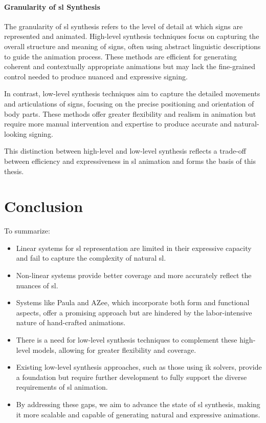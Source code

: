 \documentclass[../../main.tex]{subfiles}
\begin{document}
\paragraph{Granularity of \gls{sl} Synthesis}
\label{ch:background_work:sign_language_synthesis:3d_techniques:sign_language_synthesis_systems:granularity_of_sl_synthesis}

The granularity of \gls{sl} synthesis refers to the level of detail at which signs are represented and animated. High-level synthesis techniques focus on capturing the overall structure and meaning of signs, often using abstract linguistic descriptions to guide the animation process. These methods are efficient for generating coherent and contextually appropriate animations but may lack the fine-grained control needed to produce nuanced and expressive signing.

In contrast, low-level synthesis techniques aim to capture the detailed movements and articulations of signs, focusing on the precise positioning and orientation of body parts. These methods offer greater flexibility and realism in animation but require more manual intervention and expertise to produce accurate and natural-looking signing.

This distinction between high-level and low-level synthesis reflects a trade-off between efficiency and expressiveness in \gls{sl} animation and forms the basis of this thesis.

\section{Conclusion}
\label{ch:background_work:conclusion}

To summarize:

\begin{itemize} 
  \item Linear systems for \gls{sl} representation are limited in their expressive capacity and fail to capture the complexity of natural \gls{sl}.
  \item Non-linear systems provide better coverage and more accurately reflect the nuances of \gls{sl}.
  \item Systems like Paula and AZee, which incorporate both form and functional aspects, offer a promising approach but are hindered by the labor-intensive nature of hand-crafted animations.
  \item There is a need for low-level synthesis techniques to complement these high-level models, allowing for greater flexibility and coverage.
  \item Existing low-level synthesis approaches, such as those using \gls{ik} solvers, provide a foundation but require further development to fully support the diverse requirements of \gls{sl} animation.
  \item By addressing these gaps, we aim to advance the state of \gls{sl} synthesis, making it more scalable and capable of generating natural and expressive animations.
\end{itemize}
\end{document}
